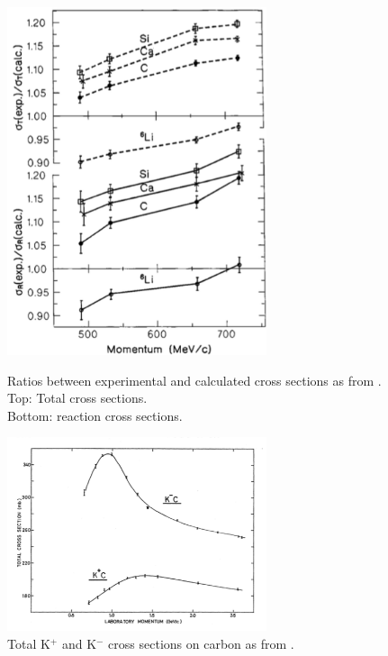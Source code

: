 \begin{figure}
\captionsetup{justification=raggedright}  
	\begin{minipage}[t]{.53\textwidth}  
	  \centering  
	   \includegraphics[width=3in]{Chapter-1/Images/Friedmann.png}
	   	        \caption{Ratios between experimental and calculated cross sections as from \cite{Friedman:1997eq}. Top: Total cross sections. \\Bottom: reaction cross sections.}
        \label{fig:Friedmann}
	\end{minipage}%
	\begin{minipage}[t]{0.53\textwidth}  
	  \centering  
	\includegraphics[width=3in]{Chapter-1/Images/Bugg.png}
        \caption{Total K$^+$  and K$^-$ cross sections on carbon as from \cite{PhysRev.168.1466}.}
        \label{fig:Bugg}
	\end{minipage}
	\par
\end{figure}







